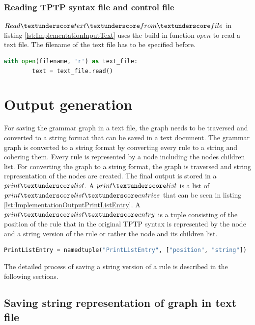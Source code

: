 \subsubsection{Reading \ac{TPTP} syntax file and control file}

$Read\textunderscore text\textunderscore from\textunderscore file$ in listing \ref{lst:ImplementationInputText} uses the build-in function $open$ to read a text file. The filename of the text file has to be specified before.\\

\begin{lstlisting}[language=Python, basicstyle=\scriptsize	,caption= Read text from file,label= lst:ImplementationInputText]
with open(filename, 'r') as text_file:
        text = text_file.read()
\end{lstlisting}

\section{Output generation}\label{sec:ImplementationOutputGeneration}
For saving the grammar graph in a text file, the graph needs to be traversed and converted to a string format that can be saved in a text document. The grammar graph is converted to a string format by converting every rule to a string and cohering them. Every rule is represented by a node including the nodes children list. For converting the graph to a string format, the graph is traversed and string representation of the nodes are created.
The final output is stored in a $print\textunderscore list$. A $print\textunderscore list$ is a list of $print\textunderscore list\textunderscore entries$ that can be seen in listing \ref{lst:ImplementationOutputPrintListEntry}. A $print\textunderscore list\textunderscore entry$ is a tuple consisting of the position of the rule that in the original \ac{TPTP} syntax is represented by the node and a string version of the rule or rather the node and its children list.

\begin{lstlisting}[language=Python, basicstyle=\scriptsize	,caption= Print list entry,label= lst:ImplementationOutputPrintListEntry]
PrintListEntry = namedtuple("PrintListEntry", ["position", "string"])
\end{lstlisting}

The detailed process of saving a string version of a rule is described in the following sections.

\subsection{Saving string representation of graph in text file}\label{sec:ImplementationOutputSaveGrammarGraphStringRepresentations}

